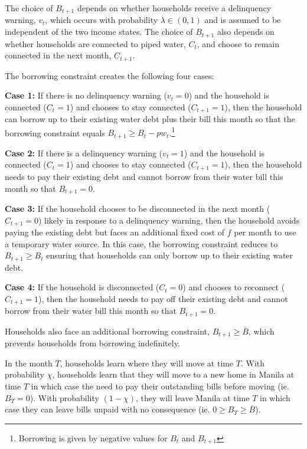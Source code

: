 \documentclass[12pt,table]{article}
\begin{document}
The choice of $B_{t+1}$ depends on whether households receive a delinquency warning, $v_t$, which occurs with probability $\lambda \in (0,1)$ and is assumed to be independent of the two income states.  The choice of $B_{t+1}$ also depends on whether households are connected to piped water, $C_t$, and choose to remain connected in the next month, $C_{t+1}$.  


The borrowing constraint creates the following four cases:

\textbf{Case 1:} If there is no delinquency warning ($v_t=0$) and the household is connected ($C_{t}=1$) and chooses to stay connected ($C_{t+1}=1$), then the household can borrow up to their existing water debt plus their bill this month so that the borrowing constraint equals $B_{t+1}\geq B_t -  p w_t $.\footnote{Borrowing is given by negative values for $B_t$ and $B_{t+1}$}

\textbf{Case 2:} If there is a delinquency warning ($v_t=1$) and the household is connected ($C_t=1$) and chooses to stay connected ($C_{t+1}=1$), then the household needs to pay their existing debt and cannot borrow from their water bill this month so that $B_{t+1} = 0$.

\textbf{Case 3:} If the household chooses to be disconnected in the next month ($C_{t+1}=0$) likely in response to a delinquency warning, then the household avoids paying the existing debt but faces an additional fixed cost of $f$ per month to use a temporary water source.  In this case, the borrowing constraint reduces to $ B_{t+1} \geq B_t$ ensuring that households can only borrow up to their existing water debt.  

\textbf{Case 4:} If the household is disconnected ($C_t=0$) and chooses to reconnect ($C_{t+1}=1$), then the household needs to pay off their existing debt and cannot borrow from their water bill this month so that $B_{t+1} = 0$.  

Households also face an additional borrowing constraint, $ B_{t+1} \geq \overline{B}$, which prevents households from borrowing indefinitely.  

In the month $\overline{T}$, households learn where they will move at time $T$. With probability $\chi$, households learn that they will move to a new home in Manila at time $T$ in which case the need to pay their outstanding bills before moving (ie. $B_T=0$).  With probability $(1-\chi)$, they will leave Manila at time $T$ in which case they can leave bills unpaid with no consequence (ie. $0\geq B_T \geq \overline{B}$).
\end{document}

